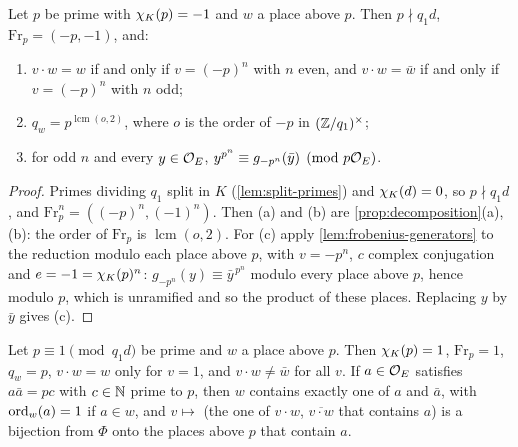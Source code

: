 \begin{corollary}\label{cor:inert}
Let $p$ be prime with $\chi_K(p)=-1$ and $w$ a place above $p$. Then $p\nmid q_1d$,
$\mathrm{Fr}_p=(-p,-1)$, and:
\begin{enumerate}[label=\textup{(\alph*)}]
\item $v\cdot w=w$ if and only if $v=(-p)^n$ with $n$ even, and $v\cdot w=\bar w$ if and only if
$v=(-p)^n$ with $n$ odd;
\item $q_w=p^{\operatorname{lcm}(o,2)}$, where $o$ is the order of $-p$ in $(\mathbb{Z}/q_1)^\times$;
\item for odd $n$ and every $y\in\mathcal{O}_E$, $y^{p^n}\equiv g_{-p^n}(\bar y)\pmod{p\mathcal{O}_E}$.
\end{enumerate}
\end{corollary}

\begin{proof}
Primes dividing $q_1$ split in $K$ (\cref{lem:split-primes}) and $\chi_K(d)=0$, so $p\nmid q_1d$, and
$\mathrm{Fr}_p^n=((-p)^n,(-1)^n)$. Then (a) and (b) are \cref{prop:decomposition}(a),(b): the order of
$\mathrm{Fr}_p$ is $\operatorname{lcm}(o,2)$. For (c) apply \cref{lem:frobenius-generators} to the
reduction modulo each place above $p$, with $v=-p^n$, $c$ complex conjugation and $e=-1=\chi_K(p)^n$:
$g_{-p^n}(y)\equiv\bar y^{\,p^n}$ modulo every place above $p$, hence modulo $p$, which is
unramified and so the product of these places. Replacing $y$ by $\bar y$ gives (c).
\end{proof}

\begin{proposition}\label{prop:split-one}
Let $p\equiv1\pmod{q_1d}$ be prime and $w$ a place above $p$. Then $\chi_K(p)=1$,
$\mathrm{Fr}_p=1$, $q_w=p$, $v\cdot w=w$ only for $v=1$, and $v\cdot w\ne\bar w$ for all $v$. If
$a\in\mathcal{O}_E$ satisfies $a\bar a=pc$ with $c\in\mathbb{N}$ prime to $p$, then $w$ contains exactly one of $a$
and $\bar a$, with $\operatorname{ord}_w(a)=1$ if $a\in w$, and $v\mapsto$ (the one of $v\cdot w$,
$\overline{v\cdot w}$ that contains $a$) is a bijection from $\Phi$ onto the places above $p$ that
contain $a$.
\end{proposition}

